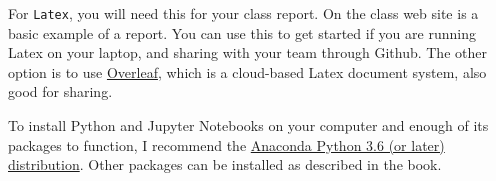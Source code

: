 For {\tt Latex}, you will need this for your class report. On the
class web site is a basic example of a report. You can use this to get
started if you are running Latex on your laptop, and sharing with your
team through Github. The other option is to use
\href{http://overleaf.com}{\color{red} Overleaf}, which is a
cloud-based Latex document system, also good for sharing.

To install Python and Jupyter Notebooks on your computer and enough of
its packages to function, I recommend the
\href{https://www.continuum.io/downloads}{\color{red} Anaconda Python
  3.6 (or later) distribution}. Other packages can be installed as
described in the book.

